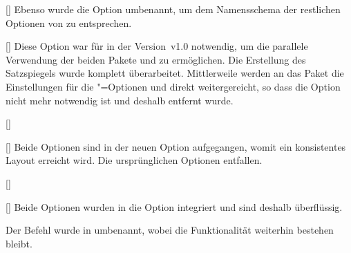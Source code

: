 \begin{Declaration}[v2.00]{[\PBoolean]}
%
Ebenso wurde die Option  umbenannt, um dem Namensschema der 
restlichen Optionen von \TUDScript zu entsprechen.
\end{Declaration}

\begin{Declaration}[v2.00]{[\PSet]}
%
Diese Option war für \TUDScript in der Version~v1.0 notwendig, um die parallele 
Verwendung der beiden Pakete  und  zu 
ermöglichen. Die Erstellung des Satzspiegels wurde komplett überarbeitet. 
Mittlerweile werden an das Paket  die Einstellungen für die 
\KOMAScript"=Optionen  und  direkt 
weitergereicht, so dass die Option  nicht mehr notwendig ist 
und deshalb entfernt wurde.
\end{Declaration}

\begin{Declaration}[v2.00]{[\PBoolean]}
\begin{Declaration}[v2.00]{[\PBoolean]}
%
Beide Optionen sind in der neuen Option  
aufgegangen, womit ein konsistentes Layout erreicht wird. Die ursprünglichen 
Optionen entfallen. 
\end{Declaration}
\end{Declaration}

\begin{Declaration}[v2.00]{[\PBoolean]}
\begin{Declaration}[v2.00]{[\PBoolean]}
%
Beide Optionen wurden in die Option  integriert und sind 
deshalb überflüssig.
\end{Declaration}
\end{Declaration}

\begin{Declaration}[v2.00]{}
%
Der Befehl  wurde in  umbenannt, wobei die 
Funktionalität weiterhin bestehen bleibt.
\end{Declaration}

